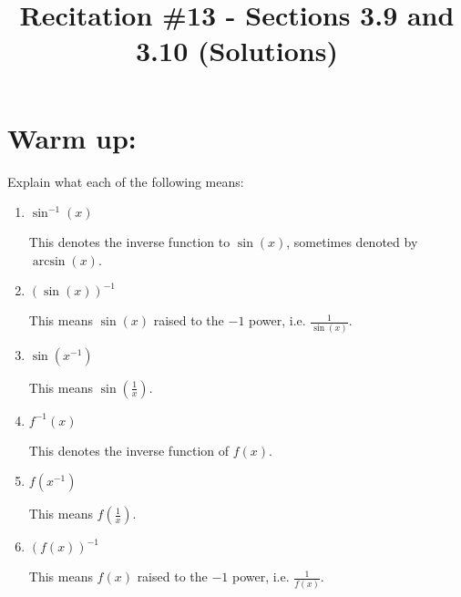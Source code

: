 \documentclass[nooutcomes]{ximera}
\title{Recitation \#13 - Sections 3.9 and 3.10 (Solutions)}
\begin{document}
\begin{abstract}		\end{abstract}
\maketitle

\section*{Warm up:} 
Explain what each of the following means:
	\begin{enumerate}
	
	\item  $\sin^{-1}(x)$
		\begin{freeResponse}
		This denotes the inverse function to $\sin(x)$, sometimes denoted by $\arcsin(x)$.  
		\end{freeResponse}	
		
	\item  $\left( \sin(x) \right)^{-1}$
		\begin{freeResponse}
		This means $\sin(x)$ raised to the $-1$ power, i.e. $\frac{1}{\sin(x)}$.  
		\end{freeResponse}	
		
	\item  $\sin \left(x^{-1} \right)$
		\begin{freeResponse}
		This means $\sin \left( \frac{1}{x} \right)$.
		\end{freeResponse}	
		
	\item  $f^{-1}(x)$
		\begin{freeResponse}
		This denotes the inverse function of $f(x)$.  
		\end{freeResponse}	
		
	\item  $f(x^{-1})$
		\begin{freeResponse}
		This means $f \left( \frac{1}{x} \right)$.
		\end{freeResponse}	
		
	\item  $\left( f(x) \right)^{-1}$
		\begin{freeResponse}
		This means $f(x)$ raised to the $-1$ power, i.e. $\frac{1}{f(x)}$.  
		\end{freeResponse}	
	
	
		
	\end{enumerate}
		
\end{document}
